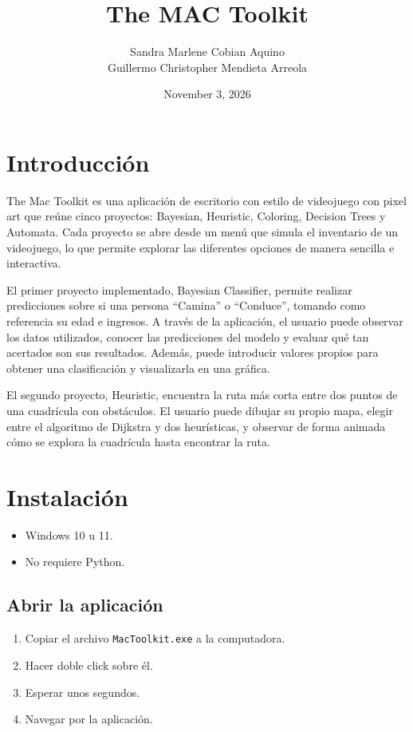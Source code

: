 \documentclass{article}
\title{\huge The MAC Toolkit}
\author{Sandra Marlene Cobian Aquino \\ Guillermo Christopher Mendieta Arreola}
\date{November 3, 2026}
\begin{document}
\maketitle

\newpage

\section{Introducción}

\justifying
The Mac Toolkit es una aplicación de escritorio con estilo de videojuego con pixel art que reúne cinco proyectos: Bayesian, Heuristic, Coloring, Decision Trees y Automata. Cada proyecto se abre desde un menú que simula el inventario de un videojuego, lo que permite explorar las diferentes opciones de manera sencilla e interactiva.

El primer proyecto implementado, Bayesian Classifier, permite realizar predicciones sobre si una persona ``Camina'' o ``Conduce'', tomando como referencia su edad e ingresos. A través de la aplicación, el usuario puede observar los datos utilizados, conocer las predicciones del modelo y evaluar qué tan acertados son sus resultados. Además, puede introducir valores propios para obtener una clasificación y visualizarla en una gráfica.

El segundo proyecto, Heuristic, encuentra la ruta más corta entre dos puntos de una cuadrícula con obstáculos. El usuario puede dibujar su propio mapa, elegir entre el algoritmo de Dijkstra y dos heurísticas, y observar de forma animada cómo se explora la cuadrícula hasta encontrar la ruta.

\section{Instalación}

\begin{itemize}
  \item Windows 10 u 11.
  \item No requiere Python.
\end{itemize}

\subsection{Abrir la aplicación}

\begin{enumerate}
  \item Copiar el archivo \texttt{MacToolkit.exe} a la computadora.
  \item Hacer doble click sobre él.
  \item Esperar unos segundos.
  \item Navegar por la aplicación.
\end{enumerate}
\end{document}
